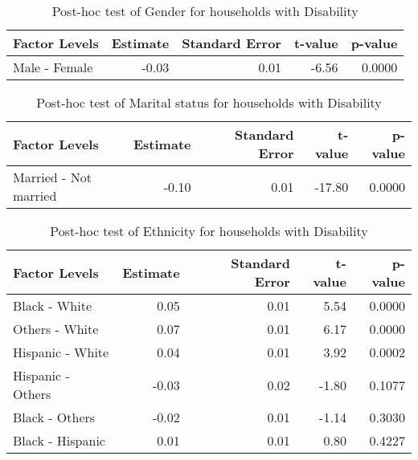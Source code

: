 \begin{table}[H]
\footnotesize
\centering
\begin{tabular}{lrrrr}
  \hline
Factor Levels & Estimate & Standard Error & t-value & p-value \\ 
  \hline
 Male - Female & -0.03 & 0.01 & -6.56 & 0.0000 \\ 
   \hline
\end{tabular}
\caption{Post-hoc test of Gender for households with Disability} 
\label{tab:genderDisb}
\end{table}

\begin{table}[H]
\footnotesize
\centering
\begin{tabular}{lrrrr}
  \hline
Factor Levels & Estimate & Standard Error & t-value & p-value \\ 
  \hline
 Married - Not married & -0.10 & 0.01 & -17.80 & 0.0000 \\ 
   \hline
\end{tabular}
\caption{Post-hoc test of Marital status for households with Disability} 
\label{tab:msDisb}
\end{table}

\begin{table}[H]
\footnotesize
\centering
\begin{tabular}{lrrrr}
  \hline
Factor Levels & Estimate & Standard Error & t-value & p-value \\ 
  \hline
 Black - White & 0.05 & 0.01 & 5.54 & 0.0000 \\ 
   Others - White & 0.07 & 0.01 & 6.17 & 0.0000 \\ 
   Hispanic - White & 0.04 & 0.01 & 3.92 & 0.0002 \\ 
   Hispanic - Others & -0.03 & 0.02 & -1.80 & 0.1077 \\ 
   Black - Others & -0.02 & 0.01 & -1.14 & 0.3030 \\ 
   Black - Hispanic & 0.01 & 0.01 & 0.80 & 0.4227 \\ 
   \hline
\end{tabular}
\caption{Post-hoc test of Ethnicity for households with Disability} 
\label{tab:race_originDisb}
\end{table}

